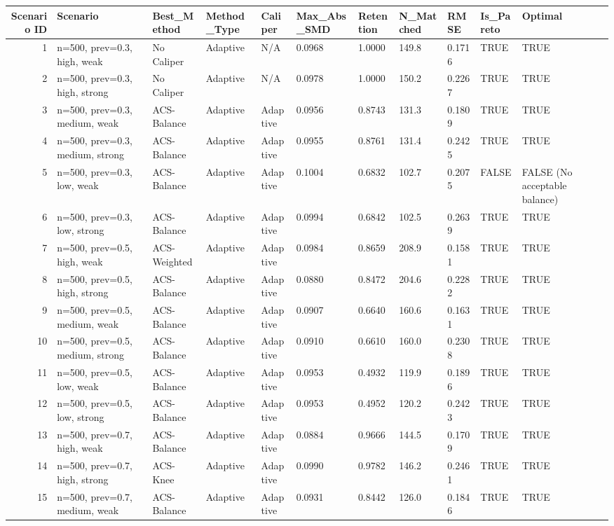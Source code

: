 \begin{tabular}{rllllllllll}
\toprule
Scenario ID & Scenario & Best_Method & Method_Type & Caliper & Max_Abs_SMD & Retention & N_Matched & RMSE & Is_Pareto & Optimal \\
\midrule
1 & n=500, prev=0.3, high, weak & No Caliper & Adaptive & N/A & 0.0968 & 1.0000 & 149.8 & 0.1716 & TRUE & TRUE \\
2 & n=500, prev=0.3, high, strong & No Caliper & Adaptive & N/A & 0.0978 & 1.0000 & 150.2 & 0.2267 & TRUE & TRUE \\
3 & n=500, prev=0.3, medium, weak & ACS-Balance & Adaptive & Adaptive & 0.0956 & 0.8743 & 131.3 & 0.1809 & TRUE & TRUE \\
4 & n=500, prev=0.3, medium, strong & ACS-Balance & Adaptive & Adaptive & 0.0955 & 0.8761 & 131.4 & 0.2425 & TRUE & TRUE \\
5 & n=500, prev=0.3, low, weak & ACS-Balance & Adaptive & Adaptive & 0.1004 & 0.6832 & 102.7 & 0.2075 & FALSE & FALSE (No acceptable balance) \\
6 & n=500, prev=0.3, low, strong & ACS-Balance & Adaptive & Adaptive & 0.0994 & 0.6842 & 102.5 & 0.2639 & TRUE & TRUE \\
7 & n=500, prev=0.5, high, weak & ACS-Weighted & Adaptive & Adaptive & 0.0984 & 0.8659 & 208.9 & 0.1581 & TRUE & TRUE \\
8 & n=500, prev=0.5, high, strong & ACS-Balance & Adaptive & Adaptive & 0.0880 & 0.8472 & 204.6 & 0.2282 & TRUE & TRUE \\
9 & n=500, prev=0.5, medium, weak & ACS-Balance & Adaptive & Adaptive & 0.0907 & 0.6640 & 160.6 & 0.1631 & TRUE & TRUE \\
10 & n=500, prev=0.5, medium, strong & ACS-Balance & Adaptive & Adaptive & 0.0910 & 0.6610 & 160.0 & 0.2308 & TRUE & TRUE \\
11 & n=500, prev=0.5, low, weak & ACS-Balance & Adaptive & Adaptive & 0.0953 & 0.4932 & 119.9 & 0.1896 & TRUE & TRUE \\
12 & n=500, prev=0.5, low, strong & ACS-Balance & Adaptive & Adaptive & 0.0953 & 0.4952 & 120.2 & 0.2423 & TRUE & TRUE \\
13 & n=500, prev=0.7, high, weak & ACS-Balance & Adaptive & Adaptive & 0.0884 & 0.9666 & 144.5 & 0.1709 & TRUE & TRUE \\
14 & n=500, prev=0.7, high, strong & ACS-Knee & Adaptive & Adaptive & 0.0990 & 0.9782 & 146.2 & 0.2461 & TRUE & TRUE \\
15 & n=500, prev=0.7, medium, weak & ACS-Balance & Adaptive & Adaptive & 0.0931 & 0.8442 & 126.0 & 0.1846 & TRUE & TRUE \\

\end{tabular}
